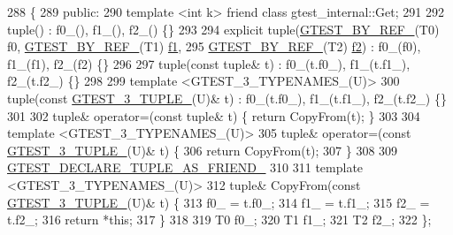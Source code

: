 \begin{DoxyCode}
288                         \{
289  \textcolor{keyword}{public}:
290   \textcolor{keyword}{template} <\textcolor{keywordtype}{int} k> \textcolor{keyword}{friend} \textcolor{keyword}{class }gtest\_internal::Get;
291 
292   tuple() : f0\_(), f1\_(), f2\_() \{\}
293 
294   \textcolor{keyword}{explicit} tuple(\hyperlink{gtest-tuple_8h_adcf9057737a411d833fac0382c13a181}{GTEST\_BY\_REF\_}(T0) f0, \hyperlink{gtest-tuple_8h_adcf9057737a411d833fac0382c13a181}{GTEST\_BY\_REF\_}(T1) 
      \hyperlink{namespacestd_1_1tr1_a9c0fa65b105f8e2f58ba59ecf75fd000}{f1},
295       \hyperlink{gtest-tuple_8h_adcf9057737a411d833fac0382c13a181}{GTEST\_BY\_REF\_}(T2) \hyperlink{namespacestd_1_1tr1_a87dd9e009868361317f587126dba63d4}{f2}) : f0\_(f0), f1\_(f1), f2\_(f2) \{\}
296 
297   tuple(\textcolor{keyword}{const} tuple& t) : f0\_(t.f0\_), f1\_(t.f1\_), f2\_(t.f2\_) \{\}
298 
299   \textcolor{keyword}{template} <GTEST\_3\_TYPENAMES\_(U)>
300   tuple(\textcolor{keyword}{const} \hyperlink{gtest-tuple_8h_af2c3eab3f1a5197b408fce44eb3ed9da}{GTEST\_3\_TUPLE\_}(U)& t) : f0\_(t.f0\_), f1\_(t.f1\_), f2\_(t.f2\_) \{\}
301 
302   tuple& operator=(\textcolor{keyword}{const} tuple& t) \{ \textcolor{keywordflow}{return} CopyFrom(t); \}
303 
304   \textcolor{keyword}{template} <GTEST\_3\_TYPENAMES\_(U)>
305   tuple& operator=(\textcolor{keyword}{const} \hyperlink{gtest-tuple_8h_af2c3eab3f1a5197b408fce44eb3ed9da}{GTEST\_3\_TUPLE\_}(U)& t) \{
306     \textcolor{keywordflow}{return} CopyFrom(t);
307   \}
308 
309   \hyperlink{gtest-tuple_8h_a2b20671273f514a88a6e9b8328e5f257}{GTEST\_DECLARE\_TUPLE\_AS\_FRIEND\_}
310 
311   \textcolor{keyword}{template} <GTEST\_3\_TYPENAMES\_(U)>
312   tuple& CopyFrom(\textcolor{keyword}{const} \hyperlink{gtest-tuple_8h_af2c3eab3f1a5197b408fce44eb3ed9da}{GTEST\_3\_TUPLE\_}(U)& t) \{
313     f0\_ = t.f0\_;
314     f1\_ = t.f1\_;
315     f2\_ = t.f2\_;
316     \textcolor{keywordflow}{return} *\textcolor{keyword}{this};
317   \}
318 
319   T0 f0\_;
320   T1 f1\_;
321   T2 f2\_;
322 \};
\end{DoxyCode}
